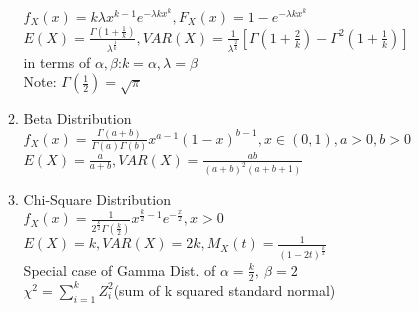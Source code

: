 \documentclass[10pt]{article}
\begin{document}
\begin{multicols}{2}
\begin{enumerate}
\begin{enumerate}
				$f_X(x) = k\lambda x^{k-1}e^{-\lambda kx^k}, F_X(x) = 1 - e^{-\lambda kx^k}$\\
				$E(X) = \frac{\Gamma(1+\frac{1}{k})}{\lambda^{\frac{1}{k}}}, VAR(X) = \frac{1}{\lambda^{\frac{2}{k}}}[\Gamma(1+\frac{2}{k}) - \Gamma^2(1+\frac{1}{k})]$\\
				in terms of $\alpha, \beta$:$k = \alpha, \lambda = \beta$\\
				Note: $\Gamma(\frac{1}{2}) = \sqrt{\pi}$
				\item Beta Distribution\\
				$f_X(x) = \frac{\Gamma(a + b)}{\Gamma(a)\Gamma(b)}x^{a-1}(1-x)^{b-1}, x \in (0,1), a>0, b>0$\\
				$E(X) = \frac{a}{a+b}, VAR(X) = \frac{ab}{(a+b)^2(a+b+1)}$
				\item Chi-Square Distribution\\
				$f_X(x) = \frac{1}{2^{\frac{k}{2}}\Gamma(\frac{k}{2})}x^{\frac{k}{2}-1}e^{-\frac{x}{2}}, x > 0$\\
				$E(X) = k, VAR(X) = 2k, M_X(t) = \frac{1}{(1-2t)^{\frac{k}{2}}}$\\
				Special case of Gamma Dist. of $\alpha = \frac{k}{2}, \ \beta = 2$\\
				$\chi^2 = \sum_{i = 1}^{k}Z_i^2$(sum of k squared standard normal)
			\end{enumerate}
			

\end{enumerate}
\end{multicols}
\end{document}
